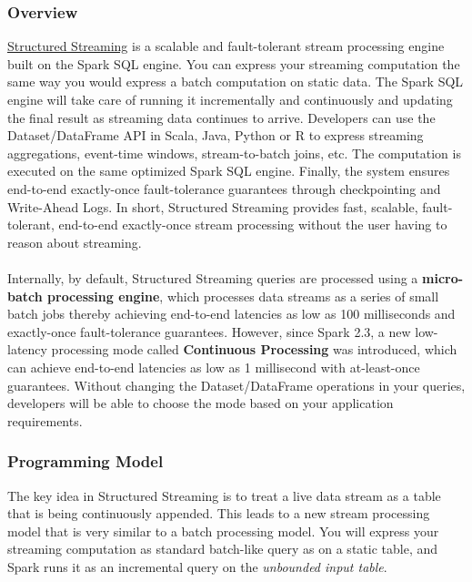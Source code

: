 \documentclass[10pt,a4paper]{article}
\newcommand{\nline}{\\~\\}
\begin{document}
 \subsubsection{Overview}
 \href{https://spark.apache.org/docs/latest/structured-streaming-programming-guide.html}{Structured Streaming} is a scalable and fault-tolerant stream processing engine built on the Spark SQL engine. You can express your streaming computation the same way you would express a batch computation on static data. The Spark SQL engine will take care of running it incrementally and continuously and updating the final result as streaming data continues to arrive. Developers can use the Dataset/DataFrame API in Scala, Java, Python or R to express streaming aggregations, event-time windows, stream-to-batch joins, etc. The computation is executed on the same optimized Spark SQL engine. Finally, the system ensures end-to-end exactly-once fault-tolerance guarantees through checkpointing and Write-Ahead Logs. In short, Structured Streaming provides fast, scalable, fault-tolerant, end-to-end exactly-once stream processing without the user having to reason about streaming. 
 \nline
 Internally, by default, Structured Streaming queries are processed using a \textbf{micro-batch processing engine}, which processes data streams as a series of small batch jobs thereby achieving end-to-end latencies as low as 100 milliseconds and exactly-once fault-tolerance guarantees. However, since Spark 2.3, a new low-latency processing mode called \textbf{Continuous Processing} was introduced, which can achieve end-to-end latencies as low as 1 millisecond with at-least-once guarantees. Without changing the Dataset/DataFrame operations in your queries, developers will be able to choose the mode based on your application requirements.
 \subsubsection{Programming Model}
 The key idea in Structured Streaming is to treat a live data stream as a table that is being continuously appended. This leads to a new stream processing model that is very similar to a batch processing model. You will express your streaming computation as standard batch-like query as on a static table, and Spark runs it as an incremental query on the \textit{unbounded input table}. 
\end{document}
